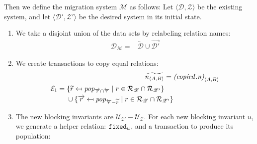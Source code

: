 \documentclass[runningheads]{llncs}
\newcommand{\id}[1]{\text{\it #1\/}}
\newcommand{\popF}[1]{\id{pop}_{#1}}
\newcommand{\declare}[3]{\id{#1}_{\pair{#2}{#3}}}
\newcommand{\pair}[2]{\langle{#1},{#2}\rangle}
\newcommand{\rels}{\mathcal{R}}   %
\newcommand{\transactions}{\mathcal{E}}
\newcommand{\rules}{\mathcal{U}}
\newcommand{\dataset}{\mathscr{D}}
\newcommand{\schema}{\mathscr{Z}}
\newcommand{\migrsys}{\mathscr{M}}
\begin{document}
   Then we define the migration system $\migrsys$ as follows:
   Let $\pair{\dataset}{\schema}$ be the existing system, and let $\pair{\dataset'}{\schema'}$ be the desired system in its initial state.
\begin{enumerate}
\item We take a disjoint union of the data sets by relabeling relation names:
   \begin{align}
      \dataset_\migrsys={}&\overleftarrow{\dataset}\cup\overrightarrow{\dataset'}
   \end{align}
\item We create transactions to copy equal relations:
   \begin{align}
      \widetilde{\declare{n}{A}{B}}={}&\declare{(\id{copied}.n)}{A}{B}\\
      \begin{split}
         \transactions_1={}&\{\widetilde{r}\mapsfrom \popF{\overrightarrow{r}\cap\overleftarrow{r}} \mid r \in \rels_\schema \cap \rels_{\schema'}\}\\
         &\cup\{\overrightarrow{r}\mapsfrom \popF{\overleftarrow{r} - \widetilde{r}} \mid r \in \rels_\schema \cap \rels_{\schema'}\}
      \end{split}
   \end{align}
\item The new blocking invariants are $\rules_{\schema'}-\rules_{\schema}$.
   For each new blocking invariant $u$, we generate a helper relation: ${\tt fixed}_u$, and a transaction to produce its population:
   

\end{enumerate}
\end{document}
